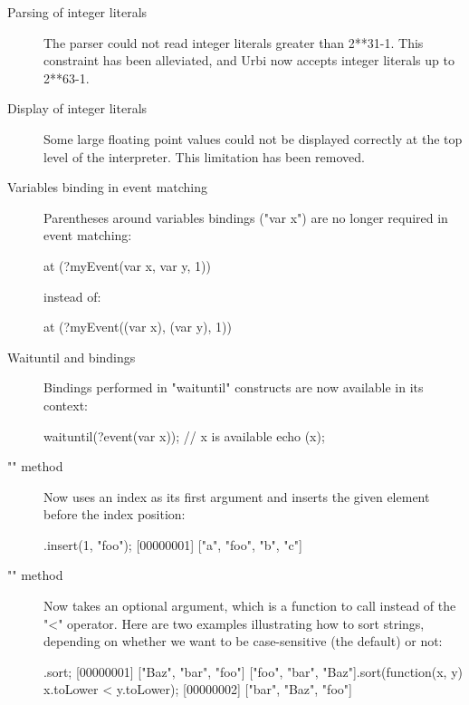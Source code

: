 \begin{description}
\item[Parsing of integer literals] The parser could not read integer
  literals greater than 2**31-1.  This constraint has been alleviated,
  and Urbi now accepts integer literals up to 2**63-1.

\item[Display of integer literals] Some large floating point values
  could not be displayed correctly at the top level of the
  interpreter. This limitation has been removed.

\item[Variables binding in event matching]

Parentheses around variables bindings ("var x") are no longer required
in event matching:

\begin{urbiunchecked}
at (?myEvent(var x, var y, 1))
\end{urbiunchecked}

\noindent
instead of:

\begin{urbiunchecked}
at (?myEvent((var x), (var y), 1))
\end{urbiunchecked}

\item[Waituntil and bindings]

  Bindings performed in "waituntil" constructs are now available in its
  context:

\begin{urbiunchecked}
waituntil(?event(var x));
// x is available
echo (x);
\end{urbiunchecked}

\item["" method]

  Now uses an index as its first argument and inserts the given element
  before the index position:

\begin{urbiscript}
["a", "b", "c"].insert(1, "foo");
[00000001] ["a", "foo", "b", "c"]
\end{urbiscript}

\item["" method]

  Now takes an optional argument, which is a function to call instead of the
  "<" operator. Here are two examples illustrating how to sort strings,
  depending on whether we want to be case-sensitive (the default) or not:

\begin{urbiscript}
.sort;
[00000001] ["Baz", "bar", "foo"]
["foo", "bar", "Baz"].sort(function(x, y) {x.toLower < y.toLower});
[00000002] ["bar", "Baz", "foo"]
\end{urbiscript}


\end{description}
